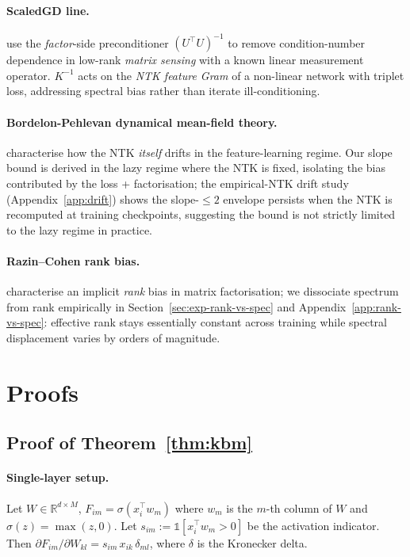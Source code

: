 \documentclass{article}
\newcommand{\R}{\mathbb{R}}
\begin{document}
\paragraph{ScaledGD line.}
\citet{tong2021accelerating,xu2023power} use the \emph{factor}-side
preconditioner $(U^\top U)^{-1}$ to remove condition-number dependence
in low-rank \emph{matrix sensing} with a known linear measurement
operator. $K^{-1}$ acts on the \emph{NTK feature Gram} of a non-linear
network with triplet loss, addressing spectral bias rather than
iterate ill-conditioning.

\paragraph{Bordelon-Pehlevan dynamical mean-field theory.}
\citet{bordelon2023self,bordelon2024dynamical} characterise how the
NTK \emph{itself} drifts in the feature-learning regime. Our slope
bound is derived in the lazy regime where the NTK is fixed,
isolating the bias contributed by the loss + factorisation; the
empirical-NTK drift study (Appendix~\ref{app:drift}) shows the
slope-$\leq 2$ envelope persists when the NTK is recomputed at
training checkpoints, suggesting the bound is not strictly limited to
the lazy regime in practice.

\paragraph{Razin--Cohen rank bias.}
\citet{razin2020implicit} characterise an implicit \emph{rank} bias
in matrix factorisation; we dissociate spectrum from rank empirically
in Section~\ref{sec:exp-rank-vs-spec} and
Appendix~\ref{app:rank-vs-spec}: effective rank stays essentially
constant across training while spectral displacement varies by
orders of magnitude.

\section{Proofs}
\label{app:proofs}

\subsection{Proof of Theorem~\ref{thm:kbm}}

\paragraph{Single-layer setup.}
Let $W \in \R^{d \times M}$, $F_{im} = \sigma(x_i^\top w_m)$ where
$w_m$ is the $m$-th column of $W$ and $\sigma(z) = \max(z, 0)$. Let
$s_{im} := \mathbb{1}[x_i^\top w_m > 0]$ be the activation indicator.
Then $\partial F_{im}/\partial W_{kl} = s_{im}\, x_{ik}\, \delta_{ml}$,
where $\delta$ is the Kronecker delta.
\end{document}
